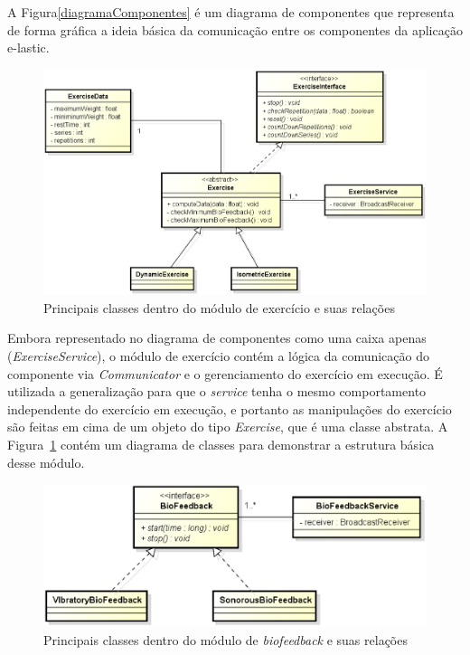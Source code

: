 A Figura\ref{diagramaComponentes} é um diagrama de componentes que representa de forma gráfica a ideia básica da comunicação entre os componentes da aplicação e-lastic.

\begin{figure}[!htb]
\centering
\includegraphics [keepaspectratio=true,scale=0.60]{figuras/diagramaExercicios.eps}
\caption{Principais classes dentro do módulo de exercício e suas relações}
\label{diagramaExercicios}
\end{figure}

Embora representado no diagrama de componentes como uma caixa apenas (\textit{ExerciseService}), o módulo de exercício contém a lógica da comunicação do componente via \textit{Communicator} e o gerenciamento do exercício em execução. É utilizada a generalização para que o \textit{service} tenha o mesmo comportamento independente do exercício em execução, e portanto as manipulações do exercício são feitas em cima de um objeto do tipo \textit{Exercise}, que é uma classe abstrata. A Figura~\ref{diagramaExercicios} contém um diagrama de classes para demonstrar a estrutura básica desse módulo.

\begin{figure}[!htb]
\centering
\includegraphics [keepaspectratio=true,scale=0.60]{figuras/diagramaBioFeedback.eps}
\caption{Principais classes dentro do módulo de \textit{biofeedback} e suas relações}
\label{diagramaBioFeedback}
\end{figure}

